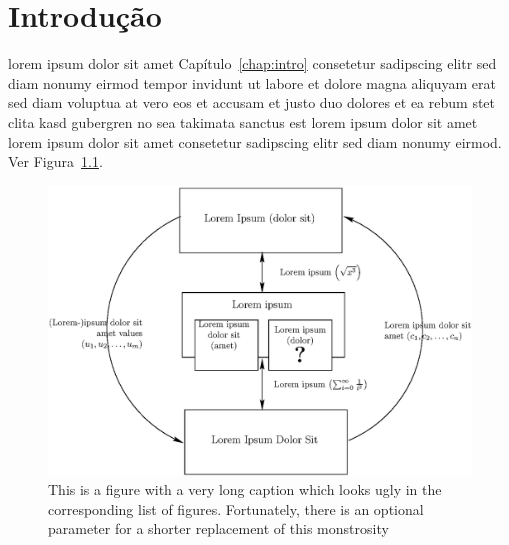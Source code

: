 \chapter{\label{chap:intro}Introdução}
%
%
%
%
%
%
%
%
lorem ipsum dolor sit amet Capítulo~\ref{chap:intro} consetetur
sadipscing elitr sed diam nonumy eirmod tempor invidunt ut labore
et dolore magna aliquyam erat sed diam voluptua at vero eos et
accusam et justo duo dolores et ea rebum stet clita kasd gubergren
no sea takimata sanctus est lorem ipsum dolor sit amet lorem ipsum
dolor sit amet consetetur sadipscing elitr sed diam nonumy eirmod.
Ver Figura~\ref{fig:fig1}.

\begin{figure}[htb!]
\centering\includegraphics[width=.65\textwidth]{fig/exemplo}
\caption%
        {\label{fig:fig1}This is a figure with a very long
    caption which looks ugly in the corresponding list of figures.
    Fortunately, there is an optional parameter for a shorter
    replacement of this monstrosity}%
\end{figure}

